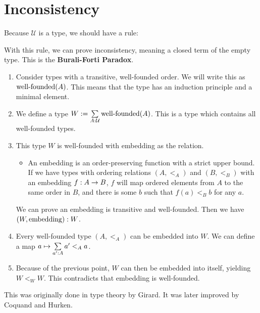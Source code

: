 \documentclass[11pt]{article}
\newcommand{\U}{\ensuremath{\mathcal{U}}}
\newcommand{\wf}[1]{\ensuremath{\textnormal{well-founded}(#1)}}
\begin{document}
\section{Inconsistency}
Because \U{} is a type, we should have a rule:
\begin{prooftree*}
  \infer0{\oftype{\Gamma}{\U}{\U}}
\end{prooftree*}
With this rule, we can prove inconsistency, meaning a closed term of
the empty type.  This is the \textbf{Burali-Forti Paradox}.
\begin{enumerate}
\item Consider types with a transitive, well-founded order.  We will
  write this as \wf{A}.  This means that the type has an induction
  principle and a minimal element.
\item We define a type $W := \dpairtype{A}{\U}{\wf{A}}$.  This is a
  type which contains all well-founded types.
\item This type $W$ is well-founded with embedding as the relation.
  \begin{itemize}
  \item An embedding is an order-preserving function with a strict
    upper bound.  If we have types with ordering relations $(A, <_A)$
    and $(B, <_B)$ with an embedding $\oftype{f}{A \rightarrow B}$,
    $f$ will map ordered elements from $A$ to the same order in $B$,
    and there is some $b$ such that $f(a) <_B b$ for any $a$.
  \end{itemize}
  We can prove an embedding is transitive and well-founded.  Then we
  have $\oftype{(W, \textnormal{embedding})}{W}$.
\item Every well-founded type $(A, <_A)$ can be embedded into $W$.  We
  can define a map $a \mapsto \dpairtype{a'}{A}{a' <_A a}$.
\item Because of the previous point, $W$ can then be embedded into
  itself, yielding $W <_W W$.  This contradicts that embedding is
  well-founded.
\end{enumerate}
This was originally done in type theory by Girard.  It was later
improved by Coquand and Hurken.
\end{document}
